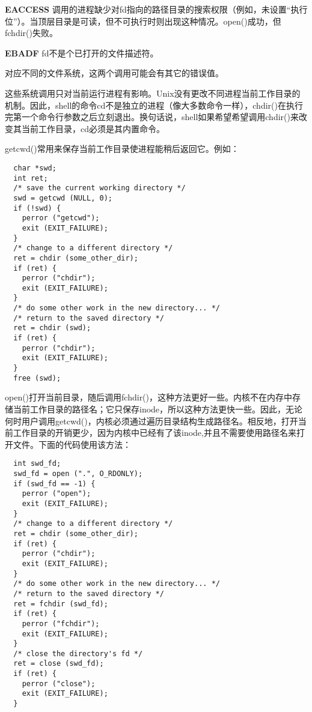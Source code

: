 \begin{eqlist*}
\item[\textbf{EACCESS}] 调用的进程缺少对fd指向的路径目录的搜索权限（例如，未设置“执行位”）。当顶层目录是可读，但不可执行时则出现这种情况。open()成功，但fchdir()失败。
\item[\textbf{EBADF}] fd不是个已打开的文件描述符。
\end{eqlist*}

对应不同的文件系统，这两个调用可能会有其它的错误值。

这些系统调用只对当前运行进程有影响。Unix没有更改不同进程当前工作目录的机制。因此，shell的命令cd不是独立的进程（像大多数命令一样），chdir()在执行完第一个命令行参数之后立刻退出。换句话说，shell如果希望希望调用chdir()来改变其当前工作目录，cd必须是其内置命令。

getcwd()常用来保存当前工作目录使进程能稍后返回它。例如：

\begin{lstlisting}
  char *swd;
  int ret;
  /* save the current working directory */
  swd = getcwd (NULL, 0);
  if (!swd) {
    perror ("getcwd");
    exit (EXIT_FAILURE);
  }
  /* change to a different directory */
  ret = chdir (some_other_dir);
  if (ret) {
    perror ("chdir");
    exit (EXIT_FAILURE);
  }
  /* do some other work in the new directory... */
  /* return to the saved directory */
  ret = chdir (swd);
  if (ret) {
    perror ("chdir");
    exit (EXIT_FAILURE);
  }
  free (swd);
\end{lstlisting}

open()打开当前目录，随后调用fchdir()，这种方法更好一些。内核不在内存中存储当前工作目录的路径名；它只保存inode，所以这种方法更快一些。因此，无论何时用户调用getcwd()，内核必须通过遍历目录结构生成路径名。相反地，打开当前工作目录的开销更少，因为内核中已经有了该inode,并且不需要使用路径名来打开文件。下面的代码使用该方法：

\begin{lstlisting}
  int swd_fd;
  swd_fd = open (".", O_RDONLY);
  if (swd_fd == -1) {
    perror ("open");
    exit (EXIT_FAILURE);
  }
  /* change to a different directory */
  ret = chdir (some_other_dir);
  if (ret) {
    perror ("chdir");
    exit (EXIT_FAILURE);
  }
  /* do some other work in the new directory... */
  /* return to the saved directory */
  ret = fchdir (swd_fd);
  if (ret) {
    perror ("fchdir");
    exit (EXIT_FAILURE);
  }
  /* close the directory's fd */
  ret = close (swd_fd);
  if (ret) {
    perror ("close");
    exit (EXIT_FAILURE);
  }
\end{lstlisting}

